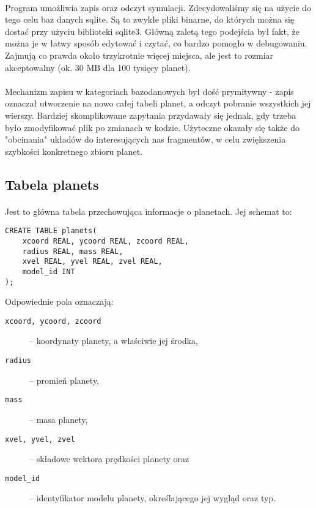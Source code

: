 \paragraph{}
Program umożliwia zapis oraz odczyt symulacji. Zdecydowaliśmy się na użycie do tego celu baz danych sqlite. Są to zwykłe pliki binarne, do których można się dostać przy użyciu biblioteki sqlite3\cite{sqlite3}. Główną zaletą tego podejścia był fakt, że można je w łatwy sposób edytować i czytać, co bardzo pomogło w debugowaniu. Zajmują co prawda około trzykrotnie więcej miejsca, ale jest to rozmiar akceptowalny (ok. 30 MB dla 100 tysięcy planet).

\paragraph{}
Mechanizm zapisu w kategoriach bazodanowych był dość prymitywny - zapis oznaczał utworzenie na nowo całej tabeli planet, a odczyt pobranie wszystkich jej wierszy. Bardziej skomplikowane zapytania przydawały się jednak, gdy trzeba było zmodyfikować plik po zmianach w kodzie. Użyteczne okazały się także do "obcinania" układów do interesujących nas fragmentów, w celu zwiększenia szybkości konkretnego zbioru planet.

\subsection{Tabela planets}
\paragraph{}
Jest to główna tabela przechowująca informacje o planetach. Jej schemat to:
\begin{verbatim}
CREATE TABLE planets(
    xcoord REAL, ycoord REAL, zcoord REAL,
    radius REAL, mass REAL,
    xvel REAL, yvel REAL, zvel REAL,
    model_id INT
);
\end{verbatim}

Odpowiednie pola oznaczają:
\begin{description}
\item[\texttt{xcoord, ycoord, zcoord}] -- koordynaty planety, a właściwie jej środka,
\item[\texttt{radius}] -- promień planety,
\item[\texttt{mass}] -- masa planety,
\item[\texttt{xvel, yvel, zvel}] -- składowe wektora prędkości planety oraz
\item[\texttt{model\_id}] -- identyfikator modelu planety, określającego jej wygląd oraz typ.
\end{description}

